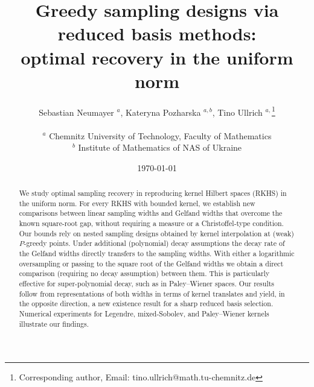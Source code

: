 \documentclass[11pt,reqno, a4paper]{article}
\numberwithin{equation}{section}
\begin{document}

\title{Greedy sampling designs via reduced basis methods:\\optimal recovery in the uniform norm}

\author{Sebastian Neumayer $\!{}^{a}$,
Kateryna Pozharska $\!{}^{a,b}$,
Tino Ullrich $\!{}^{a,}$\footnote{Corresponding author, Email:
tino.ullrich@math.tu-chemnitz.de}\\\\
${}^{a}\!$ Chemnitz University of Technology, Faculty of Mathematics\\[2mm]
${}^{b}\!$ Institute of Mathematics of NAS of Ukraine}

\date{\today}

\maketitle

\begin{abstract}
We study optimal sampling recovery in reproducing kernel Hilbert spaces (RKHS) in the uniform norm.
For every RKHS with bounded kernel, we establish new comparisons between linear sampling widths and Gelfand widths that overcome the known square-root gap, without requiring a measure or a Christoffel-type condition.
Our bounds rely on nested sampling designs obtained by kernel interpolation at (weak) \(P\)-greedy points. Under additional (polynomial) decay assumptions the decay rate of the Gelfand widths directly transfers to the sampling widths. With either a  logarithmic oversampling or passing to the square root of the Gelfand widths we obtain a direct comparison (requiring no decay assumption) between them. This is particularly effective for super-polynomial decay, such as in Paley–Wiener spaces.
Our results follow from representations of both widths in terms of kernel translates and yield, in the opposite direction, a new existence result for a sharp reduced basis selection.
Numerical experiments for Legendre, mixed-Sobolev, and Paley–Wiener kernels illustrate our findings.
\end{abstract}
\end{document}
